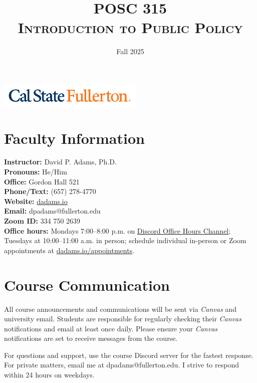 \documentclass[12pt]{article}     %
\title{\textbf{POSC 315} \\ \textsc{Introduction to Public Policy}} %
\author{}                         %
\date{Fall 2025}                  %
\begin{document}
\maketitle

\begin{center}
    \includegraphics[width=2.75in, alt={Cal State Fullerton wordmark}]{csuf_logo.png}
\end{center}


\section{Faculty Information}
\noindent \textbf{Instructor:} David P. Adams, Ph.D. \\
\noindent \textbf{Pronouns:} He/Him \\
\noindent \textbf{Office:} Gordon Hall 521 \\
\noindent \textbf{Phone/Text:} (657) 278-4770 \\
\noindent \textbf{Website:} \href{https://dadams.io}{dadams.io} \\
\noindent \textbf{Email:} dpadams@fullerton.edu \\
\noindent \textbf{Zoom ID:} 334 750 2639 \\
\noindent \textbf{Office hours:} Mondays 7:00--8:00 p.m. on \href{https://discord.gg/yxCXU9yC}{Discord Office Hours Channel}; Tuesdays at 10:00--11:00 a.m. in person; schedule individual in-person or Zoom appointments at \href{https://dadams.io/appointments}{dadams.io/appointments}. 

\section{Course Communication}
All course announcements and communications will be sent via \emph{Canvas} and university email. Students are responsible for regularly checking their \emph{Canvas} notifications and email at least once daily. Please ensure your \emph{Canvas} notifications are set to receive messages from the course.

For questions and support, use the course Discord server for the fastest response. For private matters, email me at dpadams@fullerton.edu. I strive to respond within 24 hours on weekdays.
\end{document}
